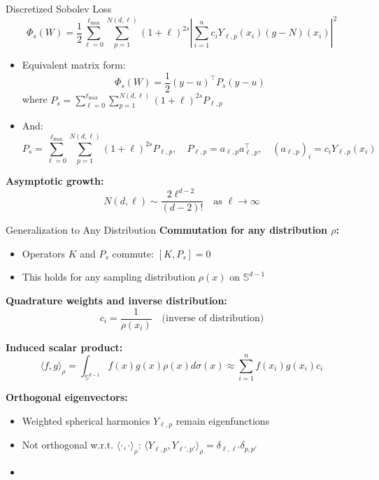 \documentclass{beamer}
\newcommand{\Sd}{\mathbb{S}^{d-1}}
\begin{document}
\begin{frame}{Discretized Sobolev Loss}
\begin{equation*}
\Phi_s(W) = \frac{1}{2} \sum_{\ell=0}^{\ell_{\max}} \sum_{p=1}^{N(d,\ell)} (1+\ell)^{2s} \left|\sum_{i=1}^n c_i Y_{\ell,p}(x_i)(g-N)(x_i)\right|^2
\end{equation*}
\begin{itemize}
\item Equivalent matrix form:
\[ \Phi_s(W) = \frac{1}{2}(y-u)^\top P_s(y-u) \]
where $P_s = \sum_{\ell=0}^{\ell_{\max}} \sum_{p=1}^{N(d,\ell)} (1+\ell)^{2s}P_{\ell,p}$
\item And:
\[ P_s = \sum_{\ell=0}^{\ell_{\max}} \sum_{p=1}^{N(d,\ell)} (1+\ell)^{2s}P_{\ell,p}, \quad P_{\ell,p} = a_{\ell,p}a_{\ell,p}^\top, \quad (a_{\ell,p})_i = c_iY_{\ell,p}(x_i) \]
\end{itemize}

\textbf{Asymptotic growth:}
\[ N(d,\ell) \sim \frac{2\ell^{d-2}}{(d-2)!} \quad \text{as } \ell \to \infty \]

\end{frame}



\begin{frame}{Generalization to Any Distribution}
\textbf{Commutation for any distribution $\rho$:}
\begin{itemize}
\item Operators $K$ and $P_s$ commute: $[K, P_s] = 0$
\item This holds for any sampling distribution $\rho(x)$ on $\Sd$
\end{itemize}

\textbf{Quadrature weights and inverse distribution:}
\[ c_i = \frac{1}{\rho(x_i)} \quad \text{(inverse of distribution)} \]

\textbf{Induced scalar product:}
\[ \langle f, g \rangle_\rho = \int_{\Sd} f(x) g(x) \rho(x) d\sigma(x) \approx \sum_{i=1}^n f(x_i) g(x_i) c_i \]

\textbf{Orthogonal eigenvectors:}
\begin{itemize}
\item Weighted spherical harmonics $Y_{\ell,p}$ remain eigenfunctions
\item Not orthogonal w.r.t. $\langle \cdot, \cdot \rangle_\rho$: $\langle Y_{\ell,p}, Y_{\ell',p'} \rangle_\rho = \delta_{\ell,\ell'} \delta_{p,p'}$
\item 
\end{itemize}
\end{frame}
\end{document}
